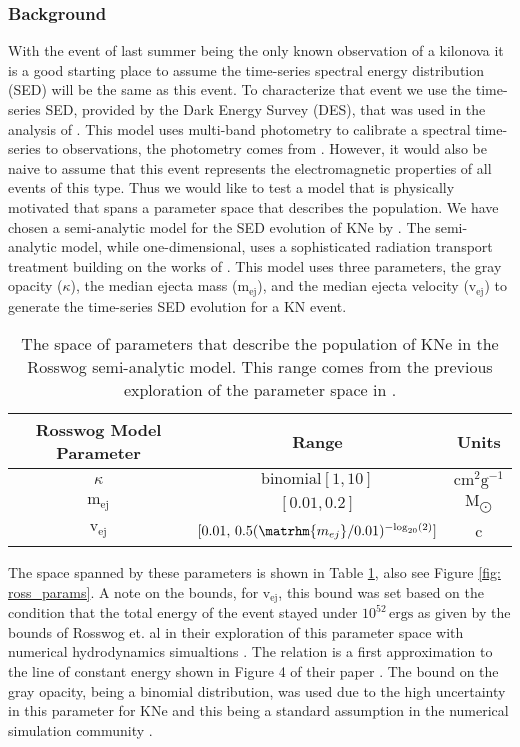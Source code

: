 \subsubsection{Background}
With the event of last summer being the only known observation of a kilonova it is a good starting place to assume the time-series spectral energy distribution (SED) will be the same as this event. To characterize that event we use the time-series SED, provided by the Dark Energy Survey (DES), that was used in the analysis of \citep{Scolnic2017a}. This model uses multi-band photometry to calibrate a spectral time-series to observations, the photometry comes from \citep{Soares-Santos2017, Cowperthwaite2017}. However, it would also be naive to assume that this event represents the electromagnetic properties of all events of this type. Thus we would like to test a model that is physically motivated that spans a parameter space that describes the population. We have chosen a semi-analytic model for the SED evolution of KNe by \citep{Rosswog2018}. The semi-analytic model, while one-dimensional, uses a sophisticated radiation transport treatment building on the works of \citep{Wollaeger2017, Pinto2000}. This model uses three parameters, the gray opacity ($\kappa$), the median ejecta mass ($\mathrm{m_{ej}}$), and the median ejecta velocity ($\mathrm{v_{ej}}$) to generate the time-series SED evolution for a KN event. \par
\begin{table}[h!]
  \centering
  \begin{tabular}{c|c|c}
    Rosswog Model Parameter & Range & Units \\
    \hline
    $\kappa$ & $\mathrm{binomial}[1, 10]$ & $\mathrm{cm^2 g^{-1}}$ \\
    \hline
    $\mathrm{m_{ej}}$ & $[0.01, 0.2]$ & $\mathrm{M_{\bigodot}}$ \\
    \hline
    $\mathrm{v_{ej}}$ & $[0.01, \, 0.5 (\matrhm{m_{ej}}/0.01)^{-\mathrm{log}_{20}(2)}]$ & c
  \end{tabular}
  \caption{The space of parameters that describe the population of KNe in the Rosswog semi-analytic model. This range comes from the previous exploration of the parameter space in \citep{Rosswog2016a}.}
  \label{tab: ross_params}
\end{table}

The space spanned by these parameters is shown in Table \ref{tab: ross_params}, also see Figure \ref{fig: ross_params}. A note on the bounds, for $\mathrm{v_{ej}}$, this bound was set based on the condition that the total energy of the event stayed under $10^{52}\, \mathrm{ergs}$ as given by the bounds of Rosswog et. al in their exploration of this parameter space with numerical hydrodynamics simualtions \citep{Rosswog2016a}. The relation is a first approximation to the line of constant energy shown in Figure 4 of their paper \citep{Rosswog2016a}. The bound on the gray opacity, being a binomial distribution, was used due to the high uncertainty in this parameter for KNe \citep{Kasen2013} and this being a standard assumption in the numerical simulation community \citep{Rosswog2018}.\par

